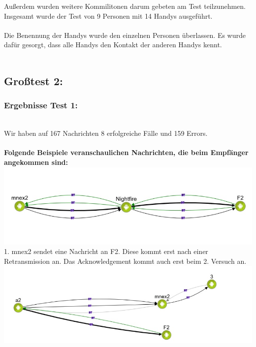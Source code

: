 Außerdem wurden weitere Kommilitonen darum gebeten am Test teilzunehmen.
Insgesamt wurde der Test von 9 Personen mit 14 Handys ausgeführt.\\\\

Die Benennung der Handys wurde den einzelnen Personen überlassen. Es
wurde dafür gesorgt, dass alle Handys den Kontakt der anderen Handys
kennt.\\\\



\subsection{Gro{\ss}test 2:}\label{grosstest-2}
\subsubsection{Ergebnisse Test 1:}\label{ergebnisse-test-1-1}
\\
Wir haben auf 167 Nachrichten 8 erfolgreiche Fälle und 159 Errors.
\\\\
\textbf{Folgende Beispiele veranschaulichen Nachrichten, die beim
Empfänger angekommen sind:}\\
\includegraphics[width=1.0\textwidth]{belege/grosstests/Bilder/Grosstest2/Test1Erfolg2.jpg}\\
1. mnex2 sendet eine Nachricht an F2. Diese kommt erst nach einer
Retransmission an. Das Acknowledgement kommt auch erst beim 2. Versuch
an.\\
\includegraphics[width=1.0\textwidth]{belege/grosstests/Bilder/Grosstest2/Test1Erfolg1.jpg}\\
